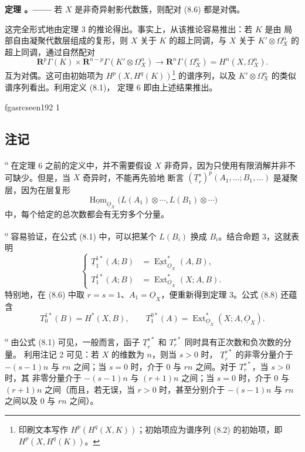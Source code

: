 \documentclass[12pt,twoside,openany]{book}
\numberwithin{equation}{section}
\newcommand{\fgaunitid}{unbound}
\newcommand{\src}[1]{%
  \phantomsection
  \hypertarget{src:\fgaunitid:#1}{}%
  \hypertarget{fga.\fgaunitid.p#1}{}%
  \ifcsname fgasrcseen#1\endcsname\else
    \expandafter\gdef\csname fgasrcseen#1\endcsname{1}%
    \hypertarget{src:#1}{}%
  \fi
  \marginpar{\raggedleft\footnotesize\sffamily #1}%
}
\newcommand{\Osh}{\underline{O}}
\newcommand{\Homsh}{\underline{\operatorname{Hom}}}
\newcommand{\Extsh}{\underline{\operatorname{Ext}}}
\theoremstyle{plain}
\theoremstyle{definition}
\theoremstyle{remark}
\newcommand{\result}[2]{%
  \par\medskip\noindent\textbf{#1%
  \if\relax\detokenize{#2}\relax\else\space#2\fi。——}\enspace
}
\begin{document}
\result{定理}{6} 若 $X$ 是非奇异射影代数簇，则配对 (8.6) 都是对偶。

这完全形式地由定理 3 的推论得出。事实上，从该推论容易推出：若 $K$ 是由
局部自由凝聚代数层组成的复形，则 $X$ 关于 $K$ 的超上同调，与 $X$ 关于
$K'\otimes\Omega_X^{n}$ 的超上同调，通过自然配对
\begin{equation}\tag{8.7}
  \mathbf R^{p}\Gamma(K)
  \times\mathbf R^{n-p}\Gamma(K'\otimes\Omega_X^{n})
  \longrightarrow\mathbf R^{n}\Gamma(\Omega_X^{n})
  =H^{n}(X,\Omega_X^{n}).
\end{equation}
互为对偶。这可由初始项为
$H^{p}(X,H^{q}(K))$\footnote{印刷文本写作
$H^{p}(H^{q}(X,K))$；初始项应为谱序列 (8.2) 的初始项，即
$H^{p}(X,H^{q}(K))$。}
的谱序列，以及 $K'\otimes\Omega_X^{n}$ 的类似谱序列看出。利用定义 (8.1)，
定理 6 即由上述结果推出。

\src{192}
\subsection*{注记}

\textsuperscript{o} 在定理 6 之前的定义中，并不需要假设 $X$
非奇异，因为只使用有限消解并非不可缺少。但是，当 $X$ 奇异时，不能再先验地
断言
$(\underline{T}_{r}^{s})^{p}(A_1,\ldots;B_1,\ldots)$ 是凝聚层，因为在层复形
\[
  \Homsh_{\Osh_X}\bigl(L(A_1)\otimes\cdots,L(B_1)\otimes\cdots\bigr)
\]
中，每个给定的总次数都会有无穷多个分量。

\medskip
{}\textsuperscript{o} 容易验证，在公式 (8.1) 中，可以把某个
$L(B_i)$ 换成 $B_i$。结合命题 3，这就表明
\begin{equation}\tag{8.8}
\left\{
\begin{aligned}
  \underline{T}_{1}^{1*}(A;B)&=\Extsh_{\Osh_X}^{*}(A,B),\\
  T_{1}^{1*}(A;B)&=\operatorname{Ext}_{\Osh_X}^{*}(X;A,B).
\end{aligned}
\right.
\end{equation}
特别地，在 (8.6) 中取 $r=s=1$、$A_1=\Osh_X$，便重新得到定理 3。公式
(8.8) 还蕴含
\[
  T_{0}^{1*}(B)=H^{*}(X,B),
  \qquad
  T_{1}^{0*}(A)=\operatorname{Ext}_{\Osh_X}^{*}(X;A,\Osh_X).
\]

\medskip
{}\textsuperscript{o} 由公式 (8.1) 可见，一般而言，函子
$\underline{T}_{r}^{s*}$ 和 $T_{r}^{s*}$ 同时具有正次数和负次数的分量。
利用注记 2 可见：若 $X$ 的维数为 $n$，则当 $s>0$ 时，
$\underline{T}_{r}^{s*}$ 的非零分量介于 $-(s-1)n$ 与 $rn$ 之间；当
$s=0$ 时，介于 $0$ 与 $rn$ 之间。对于 $T_{r}^{s*}$，当 $s>0$ 时，其
非零分量介于 $-(s-1)n$ 与 $(r+1)n$ 之间；当 $s=0$ 时，介于 $0$ 与
$(r+1)n$ 之间（而且，若无误，当 $r>0$ 时，甚至分别介于 $-(s-1)n$
与 $rn$ 之间以及 $0$ 与 $rn$ 之间）。
\end{document}

